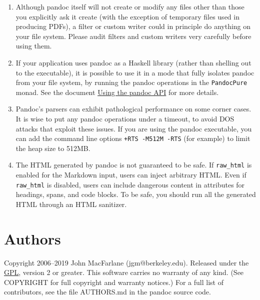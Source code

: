 \documentclass[
  12pt,
  a4paper,
]{article}
\begin{document}
\begin{enumerate}
\def\labelenumi{\arabic{enumi}.}
\item
  Although pandoc itself will not create or modify any files other than those you explicitly ask
  it create (with the exception of temporary files used in producing PDFs), a filter or custom
  writer could in principle do anything on your file system. Please audit filters and custom
  writers very carefully before using them.
\item
  If your application uses pandoc as a Haskell library (rather than shelling out to the
  executable), it is possible to use it in a mode that fully isolates pandoc from your file
  system, by running the pandoc operations in the \texttt{PandocPure} monad. See the document
  \href{http://pandoc.org/using-the-pandoc-api.html}{Using the pandoc API} for more details.
\item
  Pandoc's parsers can exhibit pathological performance on some corner cases. It is wise to put
  any pandoc operations under a timeout, to avoid DOS attacks that exploit these issues. If you
  are using the pandoc executable, you can add the command line options
  \texttt{+RTS\ -M512M\ -RTS} (for example) to limit the heap size to 512MB.
\item
  The HTML generated by pandoc is not guaranteed to be safe. If \texttt{raw\_html} is enabled for
  the Markdown input, users can inject arbitrary HTML. Even if \texttt{raw\_html} is disabled,
  users can include dangerous content in attributes for headings, spans, and code blocks. To be
  safe, you should run all the generated HTML through an HTML sanitizer.
\end{enumerate}

\hypertarget{authors}{%
\section{Authors}\label{authors}}

Copyright 2006--2019 John MacFarlane (jgm@berkeley.edu). Released under the
\href{http://www.gnu.org/copyleft/gpl.html}{GPL}, version 2 or greater. This software carries no
warranty of any kind. (See COPYRIGHT for full copyright and warranty notices.) For a full list of
contributors, see the file AUTHORS.md in the pandoc source code.
\end{document}
